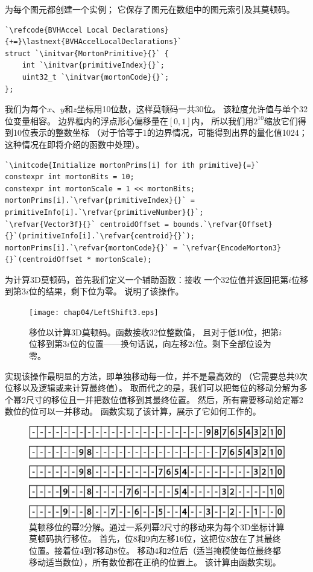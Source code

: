 为每个图元都创建一个实例；
它保存了图元在数组中的图元索引及其莫顿码。
\begin{lstlisting}
`\refcode{BVHAccel Local Declarations}{+=}\lastnext{BVHAccelLocalDeclarations}`
struct `\initvar{MortonPrimitive}{}` {
    int `\initvar{primitiveIndex}{}`;
    uint32_t `\initvar{mortonCode}{}`;
};
\end{lstlisting}

我们为每个$x$、$y$和$z$坐标用10位数，这样莫顿码一共30位。
该粒度允许值与单个32位变量相容。
边界框内的浮点形心偏移量在$[0,1]$内，
所以我们用$2^{10}$缩放它们得到10位表示的整数坐标
（对于恰等于1的边界情况，可能得到出界的量化值1024；
这种情况在即将介绍的函数中处理）。
\begin{lstlisting}
`\initcode{Initialize mortonPrims[i] for ith primitive}{=}`
constexpr int mortonBits = 10;
constexpr int mortonScale = 1 << mortonBits;
mortonPrims[i].`\refvar{primitiveIndex}{}` = primitiveInfo[i].`\refvar{primitiveNumber}{}`;
`\refvar{Vector3f}{}` centroidOffset = bounds.`\refvar{Offset}{}`(primitiveInfo[i].`\refvar{centroid}{}`);
mortonPrims[i].`\refvar{mortonCode}{}` = `\refvar{EncodeMorton3}{}`(centroidOffset * mortonScale);
\end{lstlisting}

为计算3D莫顿码，首先我们定义一个辅助函数：接收
一个32位值并返回把第$i$位移到第$3i$位的结果，剩下位为零。
说明了该操作。
\begin{figure}[htbp]
    \centering\texttt{[image: chap04/LeftShift3.eps]}
    \caption{移位以计算3D莫顿码。函数接收32位整数值，
        且对于低10位，把第$i$位移到第$3i$位的位置——换句话说，向左移$2i$位。剩下全部位设为零。}
    \label{fig:4.9}
\end{figure}

实现该操作最明显的方法，即单独移动每一位，并不是最高效的
（它需要总共9次位移以及逻辑或来计算最终值）。
取而代之的是，我们可以把每位的移动分解为多个幂2尺寸的移位且一并把数位值移到其最终位置。
然后，所有需要移动给定幂2数位的位可以一并移动。
函数实现了该计算，展示了它如何工作的。
\begin{figure}[htbp]
    \centering\includegraphics[width=0.75\linewidth]{Pictures/chap04/Mortonpow2decomposition.eps}
    \caption{莫顿移位的幂2分解。通过一系列幂2尺寸的移动来为每个3D坐标计算莫顿码执行移位。
        首先，位8和9向左移16位，这把位8放在了其最终位置。接着位4到7移动8位。
        移动4和2位后（适当掩模使每位最终都移动适当数位），所有数位都在正确的位置上。
        该计算由函数实现。}
    \label{fig:4.10}
\end{figure}

